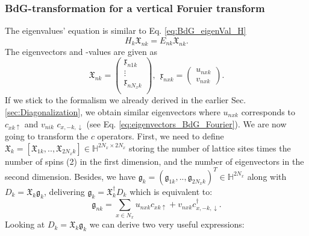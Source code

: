 \documentclass[../main.tex]{subfile}
\begin{document}
\subsubsection{BdG-transformation for a vertical Foruier transform}
The eigenvalues' equation is similar to Eq. \ref{eq:BdG_eigenVal_H}
\begin{equation}\label{eq:BdG_eigenVal_H_k}
    H_k \mathfrak{X}_{nk} = E_{nk} \mathfrak{X}_{nk}.
\end{equation}
The eigenvectors and -values are given as
\begin{equation*}
    \mathfrak{X}_{nk} = \begin{pmatrix}
        \mathfrak{x}_{n1k}\\
        \vdots\\
        \mathfrak{x}_{nN_xk}\\
    \end{pmatrix},~~ \mathfrak{x}_{nxk} = \begin{pmatrix}
        u_{nxk}\\
        v_{nxk}
    \end{pmatrix}.
\end{equation*}
If we stick to the formalism we already derived in the earlier Sec. \ref{sec:Diagonalization}, we obtain similar 
eigenvectors where $u_{nxk}$ corresponds to $c_{xk\uparrow}$ and $v_{nik}$  $c_{x,-k,\downarrow}$ (see Eq. \ref{eq:eigenvectors_BdG_Fourier}).
We are now going to transform the $c$ operators. First, we need
to define $\mathfrak{X}_k = [\mathfrak{X}_{1k}, ..,\mathfrak{X}_{2N_xk}]\in\mathbb{H}^{2N_x\times 2N_x}$ storing the number of 
lattice sites times the number of spins (2) in the first dimension, and 
the number of eigenvectors in the second dimension. Besides, we have $\mathfrak{g}_k = (\mathfrak{g}_{1k}, .., \mathfrak{g}_{2N_xk})^T\in\mathbb{H}^{2N_x}$
along with $D_{k} = \mathfrak{X}_k\mathfrak{g}_k$,
delivering $\mathfrak{g}_k = \mathfrak{X}^{\dagger}_k D_{k}$ which is equivalent to:
\begin{equation}\label{eq:eigenvectors_BdG_Fourier}
    \mathfrak{g}_{nk} = \sum_{x\in{N_x}} u_{nxk}c_{xk\uparrow} + v_{nxk}c^{\dagger}_{x,-k,\downarrow}.
\end{equation}
Looking at $D_{k} = \mathfrak{X}_k\mathfrak{g}_k$ we can derive two very useful expressions:
\end{document}
